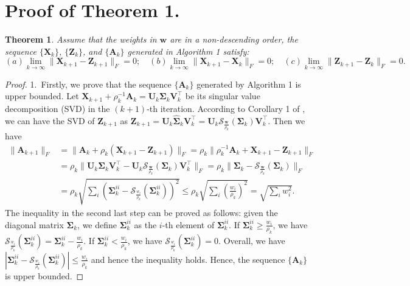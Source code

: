 \documentclass[10pt,onecolumn,letterpaper]{article}
\newtheorem{theorem}{Theorem}
\begin{document}
\section{Proof of Theorem 1.}
\begin{theorem}
Assume that the weights in $\bm{w}$ are in a non-descending order, the sequence $\{\bm{X}_{k}\}$, $\{\bm{Z}_{k}\}$, and $\{\bm{A}_{k}\}$ generated in Algorithm 1 satisfy:
\begin{equation}
(a) \lim_{k \to \infty} \|\bm{X}_{k+1}-\bm{Z}_{k+1}\|_{F}=0;
\quad
(b) \lim_{k \to \infty} \|\bm{X}_{k+1}-\bm{X}_{k}\|_{F}=0;
\quad
(c) \lim_{k \to \infty} \|\bm{Z}_{k+1}-\bm{Z}_{k}\|_{F}=0.
\end{equation}
\end{theorem}
\begin{proof}
1.\ Firstly, we prove that the sequence $\{\bm{A}_{k}\}$ generated by Algorithm 1 is upper bounded.
Let $\bm{X}_{k+1}+\rho_{k}^{-1}\bm{A}_{k}
=
\bm{U}_{k}\bm{\Sigma}_{k}\bm{V}_{k}^{\top}$
be its singular value decomposition (SVD) \cite{eckart1936approximation} in the $(k+1)$-th iteration. According to Corollary 1 of \cite{wnnmijcv}, we can have the SVD of $\bm{Z}_{k+1}$ as $\bm{Z}_{k+1}=\bm{U}_{k}\hat{\bm{\Sigma}}_{k}\bm{V}_{k}^{\top}=\bm{U}_{k}\mathcal{S}_{\frac{\bm{w}}{\rho_{k}}}(\bm{\Sigma}_{k})\bm{V}_{k}^{\top}$. 
Then we have 
\begin{align}
\|
\bm{A}_{k+1}
\|_{F}
&
=
\|
\bm{A}_{k}
+
\rho_{k}
(\bm{X}_{k+1}-\bm{Z}_{k+1})
\|_{F}
=
\rho_{k}\|
\rho_{k}^{-1}
\bm{A}_{k}
+
\bm{X}_{k+1}
-
\bm{Z}_{k+1}
\|_{F}
\\
&
=
\rho_{k}\|
\bm{U}_{k}\bm{\Sigma}_{k}\bm{V}_{k}^{\top}
-
\bm{U}_{k}\mathcal{S}_{\frac{\bm{w}}{\rho_{k}}}(\bm{\Sigma}_{k})\bm{V}_{k}^{\top}
\|_{F}
=
\rho_{k}\|
\bm{\Sigma}_{k}
-
\mathcal{S}_{\frac{\bm{w}}{\rho_{k}}}(\bm{\Sigma}_{k})
\|_{F}
\\
&
=
\rho_{k}
\sqrt{\sum_{i}(\bm{\Sigma}_{k}^{ii}-\mathcal{S}_{\frac{w_{i}}{\rho_{k}}}(\bm{\Sigma}_{k}^{ii}))^{2}}
\le
\rho_{k}
\sqrt{\sum_{i}(\frac{w_{i}}{\rho_{k}})^{2}}
=
\sqrt{\sum_{i}w_{i}^{2}}.
\end{align}
The inequality in the second last step can be proved as follows: given the diagonal matrix $\bm{\Sigma}_{k}$, we define $\bm{\Sigma}_{k}^{ii}$ as the $i$-th element of $\bm{\Sigma}_{k}^{ii}$. If $\bm{\Sigma}_{k}^{ii}\ge\frac{w_{i}}{\rho_{k}}$, we have $\mathcal{S}_{\frac{w_{i}}{\rho_{k}}}(\bm{\Sigma}_{k}^{ii})=\bm{\Sigma}_{k}^{ii}-\frac{w_{i}}{\rho_{k}}$. If $\bm{\Sigma}_{k}^{ii}<\frac{w_{i}}{\rho_{k}}$, we have $\mathcal{S}_{\frac{w_{i}}{\rho_{k}}}(\bm{\Sigma}_{k}^{ii})=0$. Overall, we have $|\bm{\Sigma}_{k}^{ii}-\mathcal{S}_{\frac{w_{i}}{\rho_{k}}}(\bm{\Sigma}_{k}^{ii})|\le\frac{w_{i}}{\rho_{k}}$ and hence the inequality holds. Hence, the sequence $\{\bm{A}_{k}\}$ is upper bounded.


\end{proof}
\end{document}
